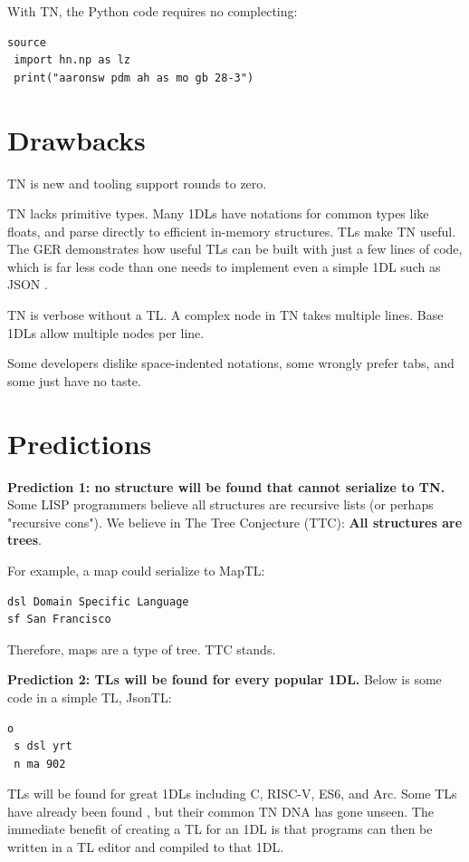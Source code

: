\documentclass[journal]{IEEEtran}
\begin{document}
With TN, the Python code requires no complecting:

\begin{lstlisting}
source
 import hn.np as lz
 print("aaronsw pdm ah as mo gb 28-3")
\end{lstlisting}

\section{Drawbacks}

TN is new and tooling support rounds to zero.

TN lacks primitive types. Many 1DLs have notations for common types like floats, and parse directly to efficient in-memory structures. TLs make TN useful. The GER demonstrates how useful TLs can be built with just a few lines of code, which is far less code than one needs to implement even a simple 1DL such as JSON \cite{Ooms}.

TN is verbose without a TL. A complex node in TN takes multiple lines. Base 1DLs allow multiple nodes per line.

Some developers dislike space-indented notations, some wrongly prefer tabs, and some just have no taste.

\section{Predictions}

\textbf{Prediction 1: no structure will be found that cannot serialize to TN.} Some LISP programmers believe all structures are recursive lists (or perhaps "recursive cons"). We believe in The Tree Conjecture (TTC): \textbf{All structures are trees}.

For example, a map could serialize to MapTL:

\begin{lstlisting}
dsl Domain Specific Language
sf San Francisco
\end{lstlisting}

Therefore, maps are a type of tree. TTC stands.

\textbf{Prediction 2: TLs will be found for every popular 1DL.} Below is some code in a simple TL, JsonTL:

\begin{lstlisting}
o
 s dsl yrt
 n ma 902
\end{lstlisting}

TLs will be found for great 1DLs including C, RISC-V, ES6, and Arc. Some TLs have already been found \cite{Roughan}, but their common TN DNA has gone unseen. The immediate benefit of creating a TL for an 1DL is that programs can then be written in a TL editor and compiled to that 1DL.
\end{document}
